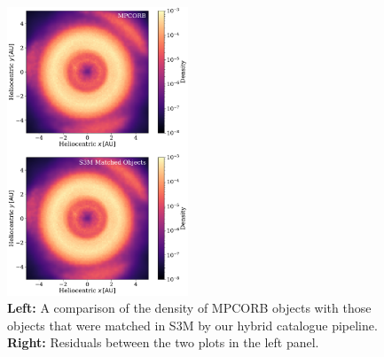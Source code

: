 \documentclass[twocolumn]{aastex631}
\newcommand{\sss}{S3M}
\newcommand{\mpco}{MPCORB}
\begin{document}
\begin{figure}[htb]
    \centering
    \includegraphics[width=0.48\textwidth]{density_comparisons.pdf}
    \caption{\textbf{Left:} A comparison of the density of \mpco{} objects with those objects that were matched in \sss{} by our hybrid catalogue pipeline. \textbf{Right:} Residuals between the two plots in the left panel.}
    \label{fig:density_compare}
\end{figure}
\end{document}
